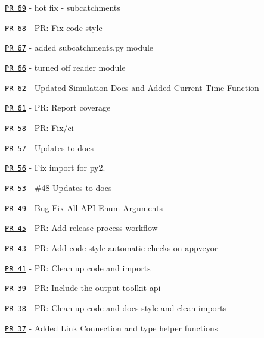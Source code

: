 \begin{DoxyItemize}
\item \href{https://github.com/OpenWaterAnalytics/pyswmm/pull/69}{\tt PR 69} -\/ hot fix -\/ subcatchments
\item \href{https://github.com/OpenWaterAnalytics/pyswmm/pull/68}{\tt PR 68} -\/ PR\+: Fix code style
\item \href{https://github.com/OpenWaterAnalytics/pyswmm/pull/67}{\tt PR 67} -\/ added subcatchments.\+py module
\item \href{https://github.com/OpenWaterAnalytics/pyswmm/pull/66}{\tt PR 66} -\/ turned off reader module
\item \href{https://github.com/OpenWaterAnalytics/pyswmm/pull/62}{\tt PR 62} -\/ Updated Simulation Docs and Added Current Time Function
\item \href{https://github.com/OpenWaterAnalytics/pyswmm/pull/61}{\tt PR 61} -\/ PR\+: Report coverage
\item \href{https://github.com/OpenWaterAnalytics/pyswmm/pull/58}{\tt PR 58} -\/ PR\+: Fix/ci
\item \href{https://github.com/OpenWaterAnalytics/pyswmm/pull/57}{\tt PR 57} -\/ Updates to docs
\item \href{https://github.com/OpenWaterAnalytics/pyswmm/pull/56}{\tt PR 56} -\/ Fix import for py2.
\item \href{https://github.com/OpenWaterAnalytics/pyswmm/pull/53}{\tt PR 53} -\/ \#48 Updates to docs
\item \href{https://github.com/OpenWaterAnalytics/pyswmm/pull/49}{\tt PR 49} -\/ Bug Fix All A\+PI Enum Arguments
\item \href{https://github.com/OpenWaterAnalytics/pyswmm/pull/45}{\tt PR 45} -\/ PR\+: Add release process workflow
\item \href{https://github.com/OpenWaterAnalytics/pyswmm/pull/43}{\tt PR 43} -\/ PR\+: Add code style automatic checks on appveyor
\item \href{https://github.com/OpenWaterAnalytics/pyswmm/pull/41}{\tt PR 41} -\/ PR\+: Clean up code and imports
\item \href{https://github.com/OpenWaterAnalytics/pyswmm/pull/39}{\tt PR 39} -\/ PR\+: Include the output toolkit api
\item \href{https://github.com/OpenWaterAnalytics/pyswmm/pull/38}{\tt PR 38} -\/ PR\+: Clean up code and docs style and clean imports
\item \href{https://github.com/OpenWaterAnalytics/pyswmm/pull/37}{\tt PR 37} -\/ Added Link Connection and type helper functions

\end{DoxyItemize}
